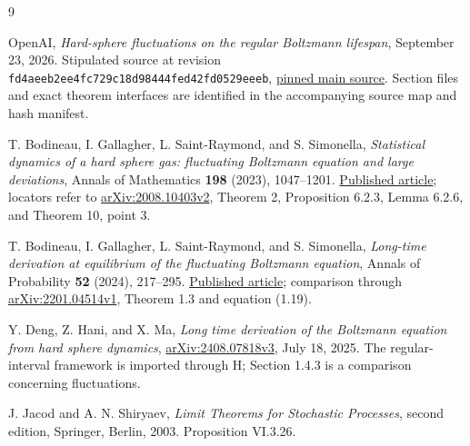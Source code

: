 \begin{thebibliography}{9}
\raggedright
{}
OpenAI, \emph{Hard-sphere fluctuations on the regular Boltzmann lifespan},
September 23, 2026. Stipulated source at revision
\texttt{fd4aeeb2ee4fc729c18d98444fed42fd0529eeeb},
\href{https://raw.githubusercontent.com/openai/math/fd4aeeb2ee4fc729c18d98444fed42fd0529eeeb/preprints/Hard-sphere-fluctuations-on-the-regular-Boltzmann-lifespan-September-23-2026/build/main.tex}{pinned main source}.
Section files and exact theorem interfaces are identified in the accompanying
source map and hash manifest.

T. Bodineau, I. Gallagher, L. Saint-Raymond, and S. Simonella,
\emph{Statistical dynamics of a hard sphere gas: fluctuating Boltzmann equation
and large deviations}, Annals of Mathematics \textbf{198} (2023), 1047--1201.
\href{https://doi.org/10.4007/annals.2023.198.3.3}{Published article};
locators refer to \href{https://arxiv.org/html/2008.10403v2}{arXiv:2008.10403v2},
Theorem 2, Proposition 6.2.3, Lemma 6.2.6, and Theorem 10, point 3.

T. Bodineau, I. Gallagher, L. Saint-Raymond, and S. Simonella,
\emph{Long-time derivation at equilibrium of the fluctuating Boltzmann equation},
Annals of Probability \textbf{52} (2024), 217--295.
\href{https://doi.org/10.1214/23-AOP1656}{Published article}; comparison through
\href{https://arxiv.org/html/2201.04514v1}{arXiv:2201.04514v1}, Theorem 1.3
and equation (1.19).

Y. Deng, Z. Hani, and X. Ma,
\emph{Long time derivation of the Boltzmann equation from hard sphere dynamics},
\href{https://arxiv.org/html/2408.07818v3}{arXiv:2408.07818v3}, July 18, 2025.
The regular-interval framework is imported through H; Section 1.4.3 is a
comparison concerning fluctuations.

J. Jacod and A. N. Shiryaev,
\emph{Limit Theorems for Stochastic Processes}, second edition,
Springer, Berlin, 2003. Proposition VI.3.26.
\end{thebibliography}
